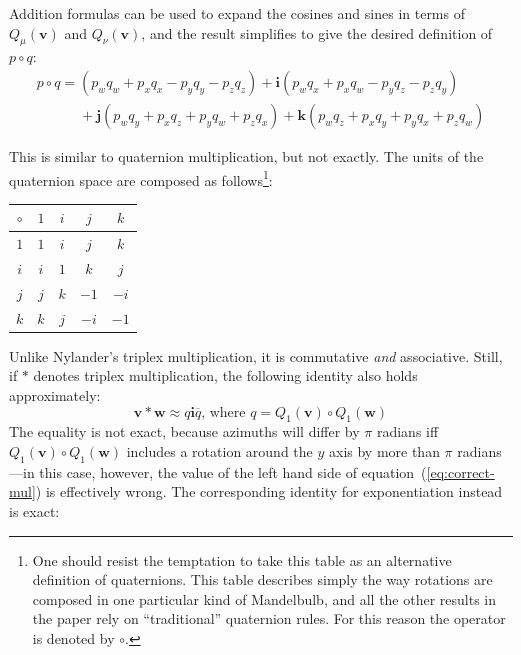 \documentclass{article}
\let\vec\mathbf
\let\bar\overline
\newcommand{\mathnewlineeq}[1][\quad]{\\\phantom{#1 = }}
\newcommand{\where}{\text{, where }}
\begin{document}
\noindent
Addition formulas can be used to expand the cosines and sines in terms
of $Q_\mu(\vec{v})$ and $Q_\nu(\vec{v})$, and the result simplifies to
give the desired definition of $p \circ q$:
\begin{equation*}
\begin{array}{l}
p \circ q =
    (p_w q_w + p_x q_x - p_y q_y - p_z q_z)
  + \vec{i} (p_w q_x + p_x q_w - p_y q_z - p_z q_y) \mathnewlineeq[p \circ q]
  + \vec{j} (p_w q_y + p_x q_z + p_y q_w + p_z q_x)
  + \vec{k} (p_w q_z + p_x q_y + p_y q_x + p_z q_w)
\end{array}
\end{equation*}

This is similar to quaternion multiplication, but not exactly.  The
units of the quaternion space are composed as follows\footnote{One should
  resist the temptation to take this table as an alternative
  definition of quaternions.  This table describes simply the
  way rotations are composed in one particular kind of Mandelbulb,
  and all the other results in the paper rely on ``traditional''
  quaternion rules.  For this reason the operator is denoted by
  $\circ$.}:

\smallskip
\begin{center}
\begin{tabular}{c|cccc}
  $\circ$ & $1$ &   $i$  &  $j$  &  $k$ \\\hline
  $1$ &     $1$ &   $i$  &  $j$  &  $k$ \\
  $i$ &     $i$ &   $1$  &  $k$  &  $j$ \\
  $j$ &     $j$ &   $k$  & $-1$  & $-i$ \\
  $k$ &     $k$ &   $j$  & $-i$  & $-1$
\end{tabular}
\end{center}
\smallskip

Unlike Nylander's triplex multiplication, it is commutative \emph{and}
associative. Still, if $\ast$ denotes triplex multiplication, the
following identity also holds approximately:
\begin{equation}
\label{eq:correct-mul}
\vec{v} \ast \vec{w} \approx q\vec{i}\bar q
   \where  q=Q_1(\vec{v}) \circ Q_1(\vec{w})
\end{equation}
\noindent
The equality is not exact, because azimuths will differ by $\pi$
radians iff $Q_1(\vec{v}) \circ Q_1(\vec{w})$ includes a rotation
around the $y$ axis by more than $\pi$ radians---in this case,
however, the value of the left hand side of
equation~(\ref{eq:correct-mul}) is effectively wrong.  The
corresponding identity for exponentiation instead is exact:
\end{document}
